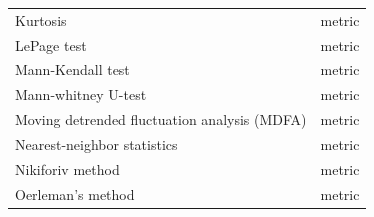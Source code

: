 \documentclass[12pt,twoside,openany]{reedthesis}
\begin{document}
\begin{longtable}[]{@{}lc@{}}
\begin{minipage}[t]{0.31\columnwidth}
Kurtosis\strut
\end{minipage} & \begin{minipage}[t]{0.35\columnwidth}\centering
metric\strut
\end{minipage}\tabularnewline
\begin{minipage}[t]{0.31\columnwidth}\raggedright
LePage test\strut
\end{minipage} & \begin{minipage}[t]{0.35\columnwidth}\centering
metric\strut
\end{minipage}\tabularnewline
\begin{minipage}[t]{0.31\columnwidth}\raggedright
Mann-Kendall
test\strut
\end{minipage} & \begin{minipage}[t]{0.35\columnwidth}\centering
metric\strut
\end{minipage}\tabularnewline
\begin{minipage}[t]{0.31\columnwidth}\raggedright
Mann-whitney
U-test\strut
\end{minipage} & \begin{minipage}[t]{0.35\columnwidth}\centering
metric\strut
\end{minipage}\tabularnewline
\begin{minipage}[t]{0.31\columnwidth}\raggedright
Moving detrended
fluctuation
analysis (MDFA)\strut
\end{minipage} & \begin{minipage}[t]{0.35\columnwidth}\centering
metric\strut
\end{minipage}\tabularnewline
\begin{minipage}[t]{0.31\columnwidth}\raggedright
Nearest-neighbor
statistics\strut
\end{minipage} & \begin{minipage}[t]{0.35\columnwidth}\centering
metric\strut
\end{minipage}\tabularnewline
\begin{minipage}[t]{0.31\columnwidth}\raggedright
Nikiforiv method\strut
\end{minipage} & \begin{minipage}[t]{0.35\columnwidth}\centering
metric\strut
\end{minipage}\tabularnewline
\begin{minipage}[t]{0.31\columnwidth}\raggedright
Oerleman's
method\strut
\end{minipage} & \begin{minipage}[t]{0.35\columnwidth}\centering
metric\strut
\end{minipage}\tabularnewline

\end{longtable}
\end{document}
